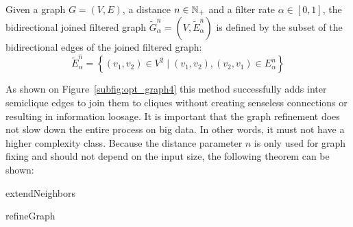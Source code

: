 \begin{envdef}
	Given a graph $G=(V,E)$, a distance $n \in \mathbb{N}_+$ and a filter rate $\alpha \in \left[0,1\right]$, the bidirectional joined filtered graph $\tilde{G}_\alpha^{\overline{n}}=(V,\tilde{E}_\alpha^{\overline{n}})$ is defined by the subset of the bidirectional edges of the joined filtered graph:
	\begin{equation}
		\tilde{E}_\alpha^{\overline{n}} = \left\{ (v_1,v_2) \in V^2 \mid (v_1,v_2),(v_2,v_1) \in E_\alpha^{\overline{n}} \right\}
	\end{equation}
\end{envdef}
As shown on Figure~\ref{subfig:opt_graph4} this method successfully adds inter semiclique edges to join them to cliques without creating senseless connections or resulting in information loosage. It is important that the graph refinement does not slow down the entire process on big data. In other words, it must not have a higher complexity class. Because the distance parameter $n$ is only used for graph fixing and should not depend on the input size, the following theorem can be shown:

\begin{algorithm}


	\caption{extendNeighbors}
\end{algorithm}

\begin{algorithm}


	\caption{refineGraph}
\end{algorithm}

